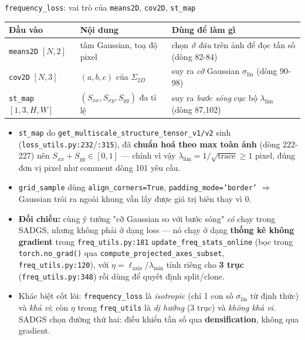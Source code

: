 \begin{frame}{\texttt{frequency\_loss}: vai trò của \texttt{means2D}, \texttt{cov2D}, \texttt{st\_map}}
\footnotesize
\begin{table}
\centering
\begin{tabular}{lll}
\toprule
\textbf{Đầu vào} & \textbf{Nội dung} & \textbf{Dùng để làm gì} \\
\midrule
\texttt{means2D} $[N,2]$ & tâm Gaussian, toạ độ pixel & chọn \emph{ở đâu} trên ảnh để đọc tần số (dòng 82-84) \\
\texttt{cov2D} $[N,3]$ & $(a,b,c)$ của $\Sigma_{2D}$ & suy ra \emph{cỡ} Gaussian $\sigma_{\text{lin}}$ (dòng 90-98) \\
\texttt{st\_map} $[1,3,H,W]$ & $(S_{xx},S_{xy},S_{yy})$ đa tỉ lệ & suy ra \emph{bước sóng} cục bộ $\lambda_{\text{lim}}$ (dòng 87,102) \\
\bottomrule
\end{tabular}
\end{table}
\begin{itemize}
    \item \texttt{st\_map} do \texttt{get\_multiscale\_structure\_tensor\_v1/v2} sinh (\texttt{loss\_utils.py:232}/\texttt{:315}), đã \textbf{chuẩn hoá theo max toàn ảnh} (dòng 222-227) nên $S_{xx}+S_{yy}\in[0,1]$ --- chính vì vậy $\lambda_{\text{lim}} = 1/\sqrt{\text{trace}} \ge 1$ pixel, đúng đơn vị pixel như comment dòng 101 yêu cầu.
    \item \texttt{grid\_sample} dùng \texttt{align\_corners=True}, \texttt{padding\_mode='border'} $\Rightarrow$ Gaussian trôi ra ngoài khung vẫn lấy được giá trị biên thay vì 0.
    \item \textbf{Đối chiếu:} cùng ý tưởng "cỡ Gaussian so với bước sóng" \emph{có} chạy trong SADGS, nhưng không phải ở dạng loss --- nó chạy ở dạng \textbf{thống kê không gradient} trong \texttt{freq\_utils.py:181} \texttt{update\_freq\_stats\_online} (bọc trong \texttt{torch.no\_grad()} qua \texttt{compute\_projected\_axes\_subset}, \texttt{freq\_utils.py:120}), với $\eta = \ell_{\text{axis}}/\lambda_{\min}$ tính riêng cho \textbf{3 trục} (\texttt{freq\_utils.py:348}) rồi dùng để quyết định split/clone.
    \item[$\Rightarrow$] Khác biệt cốt lõi: \texttt{frequency\_loss} là \emph{isotropic} (chỉ 1 con số $\sigma_{\text{lin}}$ từ định thức) và \emph{khả vi}; còn $\eta$ trong \texttt{freq\_utils} là \emph{dị hướng} (3 trục) và \emph{không khả vi}. SADGS chọn đường thứ hai: điều khiển tần số qua \textbf{densification}, không qua gradient.
\end{itemize}
\end{frame}

